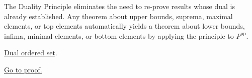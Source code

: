 \begin{remark*}[Interpretation]
The Duality Principle eliminates the need to re-prove results whose dual
is already established.  Any theorem about upper bounds, suprema, maximal
elements, or top elements automatically yields a theorem about lower
bounds, infima, minimal elements, or bottom elements by applying the
principle to $P^{\mathrm{op}}$.
\end{remark*}

\begin{remark*}[Dependencies]
\hyperref[def:dual-ordered-set]{Dual ordered set}.
\end{remark*}

\begin{remark*}[Proof]
\hyperref[prf:duality-principle]{Go to proof.}
\end{remark*}
